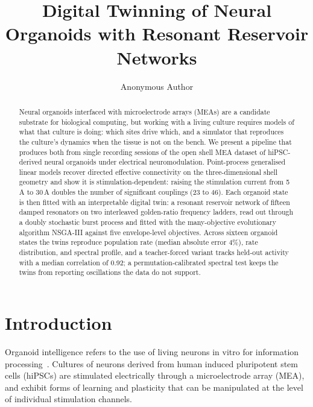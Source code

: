 \documentclass[fullpaper]{nldl}
\title{Digital Twinning of Neural Organoids with Resonant Reservoir Networks}
\author[1]{Anonymous Author}
\affil[1]{Anonymous Institution}
\newcommand{\uA}{\,\textmu A}
\begin{document}
\maketitle

\begin{abstract}
Neural organoids interfaced with microelectrode arrays (MEAs) are a candidate substrate for biological computing, but working with a living culture requires models of what that culture is doing: which sites drive which, and a simulator that reproduces the culture's dynamics when the tissue is not on the bench. We present a pipeline that produces both from single recording sessions of the open shell MEA dataset of hiPSC-derived neural organoids under electrical neuromodulation. Point-process generalised linear models recover directed effective connectivity on the three-dimensional shell geometry and show it is stimulation-dependent: raising the stimulation current from 5\uA{} to 30\uA{} doubles the number of significant couplings (23 to 46). Each organoid state is then fitted with an interpretable digital twin: a resonant reservoir network of fifteen damped resonators on two interleaved golden-ratio frequency ladders, read out through a doubly stochastic burst process and fitted with the many-objective evolutionary algorithm NSGA-III against five envelope-level objectives. Across sixteen organoid states the twins reproduce population rate (median absolute error 4\%), rate distribution, and spectral profile, and a teacher-forced variant tracks held-out activity with a median correlation of 0.92; a permutation-calibrated spectral test keeps the twins from reporting oscillations the data do not support.
\end{abstract}

\section{Introduction}
\label{sec:intro}

Organoid intelligence refers to the use of living neurons in vitro for information processing~\citep{huang2022shell,acha2026neuromodulation}. Cultures of neurons derived from human induced pluripotent stem cells (hiPSCs) are stimulated electrically through a microelectrode array (MEA), and exhibit forms of learning and plasticity that can be manipulated at the level of individual stimulation channels.
\end{document}
